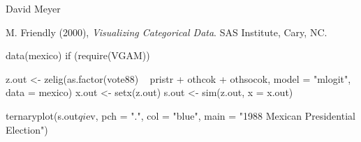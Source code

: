 \begin{Author}\relax
David Meyer\\
\end{Author}
\begin{References}\relax
M. Friendly (2000),
\emph{Visualizing Categorical Data}. SAS Institute, Cary, NC.
\end{References}
\begin{SeeAlso}\relax
{}
\end{SeeAlso}
\begin{Examples}
\begin{ExampleCode}
data(mexico)
if (require(VGAM)) { 
z.out <- zelig(as.factor(vote88) ~ pristr + othcok + othsocok, 
                model = "mlogit", data = mexico)
x.out <- setx(z.out)
s.out <- sim(z.out, x = x.out)

ternaryplot(s.out$qi$ev, pch = ".", col = "blue",
            main = "1988 Mexican Presidential Election")
}
\end{ExampleCode}
\end{Examples}


